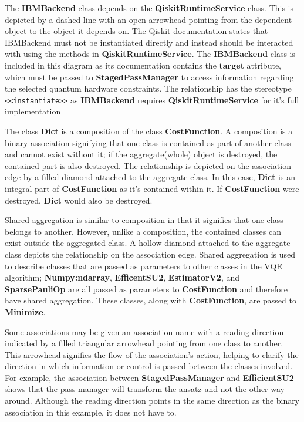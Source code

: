 \documentclass{article}
\begin{document}
The \textbf{IBMBackend} class depends on the \textbf{QiskitRuntimeService} class. This is depicted by a dashed line with an open arrowhead pointing from the dependent object to the object it depends on. The Qiskit documentation states that IBMBackend must not be instantiated directly and instead should be interacted with using the methods in \textbf{QiskitRuntimeService}\cite{IBMBackend}. The \textbf{IBMBackend} class is included in this diagram as its documentation contains the \textbf{target} attribute, which must be passed to \textbf{StagedPassManager} to access information regarding the selected quantum hardware constraints. The relationship has the stereotype \texttt{<<instantiate>>} as \textbf{IBMBackend} requires \textbf{QiskitRuntimeService} for it's full implementation\cite{Dependencyrelationships}

The class \textbf{Dict} is a composition of the class \textbf{CostFunction}. A composition is a binary association signifying that one class is contained as part of another class and cannot exist without it; if the aggregate(whole) object is destroyed, the contained part is also destroyed\cite{UMLComposition}. The relationship is depicted on the association edge by a filled diamond attached to the aggregate class. In this case, \textbf{Dict} is an integral part of \textbf{CostFunction} as it's contained within it. If \textbf{CostFunction} were destroyed, \textbf{Dict} would also be destroyed.

Shared aggregation is similar to composition in that it signifies that one class belongs to another. However, unlike a composition, the contained classes can exist outside the aggregated class\cite{Seidl_Scholz_Huemer_Kappel_Duffy_2014}. A hollow diamond attached to the aggregate class depicts the relationship on the association edge. Shared aggregation is used to describe classes that are passed as parameters to other classes in the VQE algorithm; \textbf{Numpy:ndarray}, \textbf{EfficentSU2}, \textbf{EstimatorV2}, and \textbf{SparsePauliOp} are all passed as parameters to \textbf{CostFunction} and therefore have shared aggregation. These classes, along with \textbf{CostFunction}, are passed to \textbf{Minimize}.

Some associations may be given an association name with a reading direction indicated by a filled triangular arrowhead pointing from one class to another. This arrowhead signifies the flow of the association's action, helping to clarify the direction in which information or control is passed between the classes involved\cite{Seidl_Scholz_Huemer_Kappel_Duffy_2014}. For example, the association between \textbf{StagedPassManager} and \textbf{EfficientSU2} shows that the pass manager will transform the ansatz and not the other way around. Although the reading direction points in the same direction as the binary association in this example, it does not have to\cite{Seidl_Scholz_Huemer_Kappel_Duffy_2014}.
\end{document}
